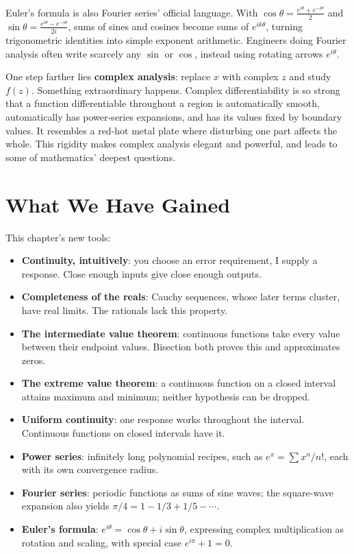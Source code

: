 Euler's formula is also Fourier series' official language. With $\cos\theta=\frac{e^{i\theta}+e^{-i\theta}}{2}$ and $\sin\theta=\frac{e^{i\theta}-e^{-i\theta}}{2i}$, sums of sines and cosines become sums of $e^{ik\theta}$, turning trigonometric identities into simple exponent arithmetic. Engineers doing Fourier analysis often write scarcely any $\sin$ or $\cos$, instead using rotating arrows $e^{i\theta}$.

One step farther lies \textbf{complex analysis}: replace $x$ with complex $z$ and study $f(z)$. Something extraordinary happens. Complex differentiability is so strong that a function differentiable throughout a region is automatically smooth, automatically has power-series expansions, and has its values fixed by boundary values. It resembles a red-hot metal plate where disturbing one part affects the whole. This rigidity makes complex analysis elegant and powerful, and leads to some of mathematics' deepest questions.

\section{What We Have Gained}

\begin{toolbox}
This chapter's new tools:

\begin{itemize}
  \item \textbf{Continuity, intuitively}: you choose an error requirement, I supply a response. Close enough inputs give close enough outputs.
  \item \textbf{Completeness of the reals}: Cauchy sequences, whose later terms cluster, have real limits. The rationals lack this property.
  \item \textbf{The intermediate value theorem}: continuous functions take every value between their endpoint values. Bisection both proves this and approximates zeros.
  \item \textbf{The extreme value theorem}: a continuous function on a closed interval attains maximum and minimum; neither hypothesis can be dropped.
  \item \textbf{Uniform continuity}: one response works throughout the interval. Continuous functions on closed intervals have it.
  \item \textbf{Power series}: infinitely long polynomial recipes, such as $e^x=\sum x^n/n!$, each with its own convergence radius.
  \item \textbf{Fourier series}: periodic functions as sums of sine waves; the square-wave expansion also yields $\pi/4=1-1/3+1/5-\cdots$.
  \item \textbf{Euler's formula}: $e^{i\theta}=\cos\theta+i\sin\theta$, expressing complex multiplication as rotation and scaling, with special case $e^{i\pi}+1=0$.
\end{itemize}
\end{toolbox}

